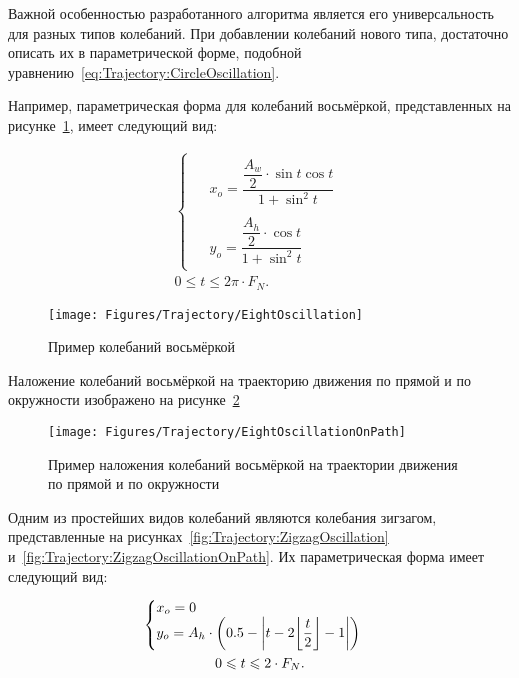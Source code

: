 Важной особенностью разработанного алгоритма является его универсальность для разных типов колебаний.
При добавлении колебаний нового типа, достаточно описать их в параметрической форме, подобной уравнению~\ref{eq:Trajectory:CircleOscillation}.

Например, параметрическая форма для колебаний восьмёркой, представленных на рисунке~\ref{fig:Trajectory:EightOscillation}, имеет следующий вид:

\begin{gather*}
    \begin{cases}
        \begin{aligned}
            &x_o = \dfrac{\dfrac{A_w}{2} \cdot \sin t \cos t}{1 + \sin^2 t} \\
            \\
            &y_o = \dfrac{\dfrac{A_h}{2} \cdot \cos t}{1 + \sin^2 t}
        \end{aligned}
    \end{cases} \\
    0 \leq t \leq 2 \pi \cdot F_N.
\end{gather*}

\begin{figure}[H]
    \centering
    \vspace{14pt}
    \texttt{[image: Figures/Trajectory/EightOscillation]}
    \caption{Пример колебаний восьмёркой}
    \label{fig:Trajectory:EightOscillation}
\end{figure}

Наложение колебаний восьмёркой на траекторию движения по прямой и по окружности изображено на рисунке~\ref{fig:Trajectory:EightOscillationOnPath}

\begin{figure}[H]
    \centering
    \vspace{14pt}
    \texttt{[image: Figures/Trajectory/EightOscillationOnPath]}
    \caption{Пример наложения колебаний восьмёркой на траектории движения по прямой и по окружности}
    \label{fig:Trajectory:EightOscillationOnPath}
\end{figure}

Одним из простейших видов колебаний являются колебания зигзагом, представленные на рисунках~\ref{fig:Trajectory:ZigzagOscillation} и~\ref{fig:Trajectory:ZigzagOscillationOnPath}.
Их параметрическая форма имеет следующий вид:

\begin{gather*}
    \begin{cases}
        \begin{aligned}
            &x_o = 0 \\
            &y_o = A_h \cdot \left( 0.5 - \left| t - 2 \floor*{\dfrac{t}{2}} - 1 \right| \right)
        \end{aligned}
    \end{cases} \\
    0 \leq t \leq 2 \cdot F_N.
\end{gather*}

